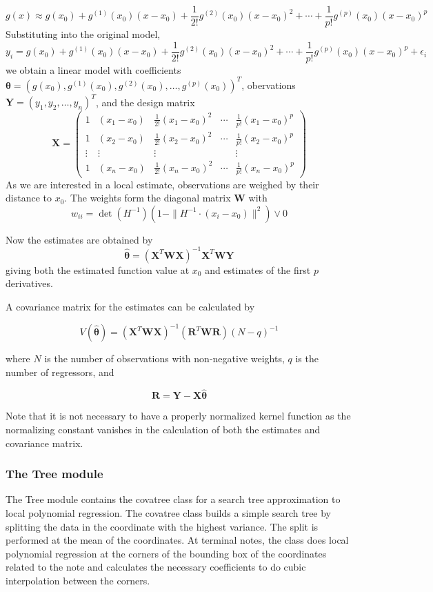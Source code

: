 \[ g(x) \approx g(x_0) + g^{(1)}(x_0)(x-x_0) + \frac{1}{2!} g^{(2)}(x_0)(x-x_0)^2 + \cdots + \frac{1}{p!} g^{(p)}(x_0)(x-x_0)^p \] Substituting into the original model, \[ y_i = g(x_0) + g^{(1)}(x_0)(x-x_0) + \frac{1}{2!} g^{(2)}(x_0)(x-x_0)^2 + \cdots + \frac{1}{p!} g^{(p)}(x_0)(x-x_0)^p + \epsilon_i \] we obtain a linear model with coefficients $ \mathbf{\theta} = (g(x_0), g^{(1)}(x_0), g^{(2)}(x_0), \ldots, g^{(p)}(x_0))^T $, obervations $ \mathbf{Y} = (y_1, y_2, \ldots, y_n)^T $, and the design matrix \[ \mathbf{X} = \left(\begin{array}{ccccc} 1 & (x_1-x_0) & \frac{1}{2!} (x_1-x_0)^2 & \cdots & \frac{1}{p!} (x_1-x_0)^p \\ 1 & (x_2-x_0) & \frac{1}{2!} (x_2-x_0)^2 & \cdots & \frac{1}{p!} (x_2-x_0)^p \\ \vdots & \vdots & \vdots & & \vdots \\ 1 & (x_n-x_0) & \frac{1}{2!} (x_n-x_0)^2 & \cdots & \frac{1}{p!} (x_n-x_0)^p \end{array}\right) \] As we are interested in a local estimate, observations are weighed by their distance to $x_0$. The weights form the diagonal matrix $\mathbf{W}$ with \[ w_{ii} = \det(H^{-1}) \left(1 - \| H^{-1} \cdot ( x_i - x_0) \| ^ 2 \right) \vee 0 \]

Now the estimates are obtained by \[ \hat{\mathbf{\theta}} = (\mathbf{X}^T\mathbf{W}\mathbf{X})^{-1} \mathbf{X}^T\mathbf{W}\mathbf{Y} \] giving both the estimated function value at $ x_0 $ and estimates of the first $ p $ derivatives.

A covariance matrix for the estimates can be calculated by

\[ V(\hat{\mathbf{\theta}}) = (\mathbf{X}^T\mathbf{W}\mathbf{X})^{-1} (\mathbf{R}^T \mathbf{W} \mathbf{R}) (N-q)^{-1} \]

where $ N $ is the number of observations with non-\/negative weights, $ q $ is the number of regressors, and

\[ \mathbf{R} = \mathbf{Y}-\mathbf{X}\hat{\mathbf{\theta}} \]

Note that it is not necessary to have a properly normalized kernel function as the normalizing constant vanishes in the calculation of both the estimates and covariance matrix.

\subsubsection*{The Tree module}

The Tree module contains the covatree class for a search tree approximation to local polynomial regression. The covatree class builds a simple search tree by splitting the data in the coordinate with the highest variance. The split is performed at the mean of the coordinates. At terminal notes, the class does local polynomial regression at the corners of the bounding box of the coordinates related to the note and calculates the necessary coefficients to do cubic interpolation between the corners.

